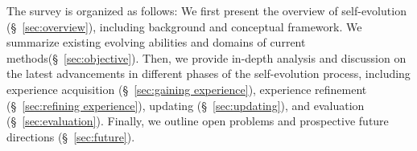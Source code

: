 \documentclass[sn-basic, Numbered]{sn-jnl}%
\theoremstyle{thmstyleone}%
\theoremstyle{thmstyletwo}%
\theoremstyle{thmstylethree}%
\begin{document}

The survey is organized as follows: We first present the overview of self-evolution (\S~\ref{sec:overview}), including background and conceptual framework. 
We summarize existing evolving abilities and domains of current methods(\S~\ref{sec:objective}). 
Then, we provide in-depth analysis and discussion on the latest advancements in different phases of the self-evolution process, including experience acquisition (\S~\ref{sec:gaining experience}), experience refinement (\S~\ref{sec:refining experience}), updating (\S~\ref{sec:updating}), and evaluation (\S~\ref{sec:evaluation}). 
Finally, we outline open problems and prospective future directions (\S~\ref{sec:future}).





\end{document}
